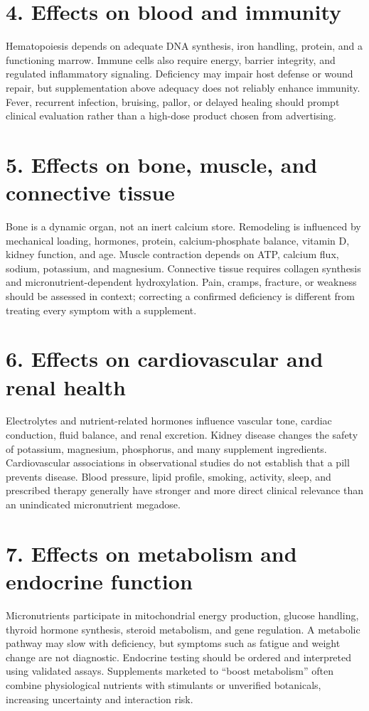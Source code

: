 {\newpage\section*{4. Effects on blood and immunity}
Hematopoiesis depends on adequate DNA synthesis, iron handling, protein, and a functioning marrow. Immune cells also require energy, barrier integrity, and regulated inflammatory signaling. Deficiency may impair host defense or wound repair, but supplementation above adequacy does not reliably enhance immunity. Fever, recurrent infection, bruising, pallor, or delayed healing should prompt clinical evaluation rather than a high-dose product chosen from advertising.

\newpage\section*{5. Effects on bone, muscle, and connective tissue}
Bone is a dynamic organ, not an inert calcium store. Remodeling is influenced by mechanical loading, hormones, protein, calcium-phosphate balance, vitamin D, kidney function, and age. Muscle contraction depends on ATP, calcium flux, sodium, potassium, and magnesium. Connective tissue requires collagen synthesis and micronutrient-dependent hydroxylation. Pain, cramps, fracture, or weakness should be assessed in context; correcting a confirmed deficiency is different from treating every symptom with a supplement.

\newpage\section*{6. Effects on cardiovascular and renal health}
Electrolytes and nutrient-related hormones influence vascular tone, cardiac conduction, fluid balance, and renal excretion. Kidney disease changes the safety of potassium, magnesium, phosphorus, and many supplement ingredients. Cardiovascular associations in observational studies do not establish that a pill prevents disease. Blood pressure, lipid profile, smoking, activity, sleep, and prescribed therapy generally have stronger and more direct clinical relevance than an unindicated micronutrient megadose.

\newpage\section*{7. Effects on metabolism and endocrine function}
Micronutrients participate in mitochondrial energy production, glucose handling, thyroid hormone synthesis, steroid metabolism, and gene regulation. A metabolic pathway may slow with deficiency, but symptoms such as fatigue and weight change are not diagnostic. Endocrine testing should be ordered and interpreted using validated assays. Supplements marketed to ``boost metabolism'' often combine physiological nutrients with stimulants or unverified botanicals, increasing uncertainty and interaction risk.

}
